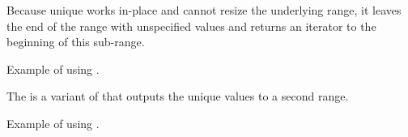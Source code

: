 Because unique works in-place and cannot resize the underlying range, it leaves the end of the range with unspecified values and returns an iterator to the beginning of this sub-range.

\begin{box-note}
\footnotesize Example of using .
\tcblower
{}
\end{box-note}

The  is a variant of  that outputs the unique values to a second range.


\begin{box-note}
\footnotesize Example of using .
\tcblower
{}
\end{box-note}
